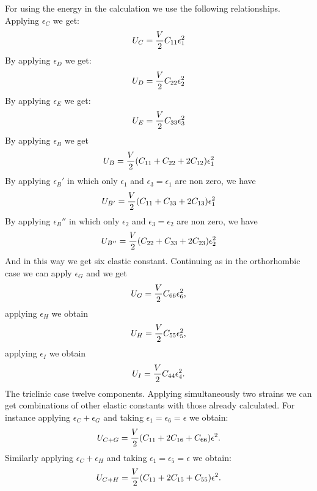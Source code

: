 \documentclass[12pt,a4paper]{article}
\begin{document}
For using the energy in the calculation we use the following
relationships. Applying $\epsilon_C$ we get:
\begin{equation}
U_C= {V \over 2} C_{11} \epsilon_1^2
\end{equation}
By applying $\epsilon_D$ we get:
\begin{equation}
U_D= {V \over 2} C_{22} \epsilon_2^2
\end{equation}
By applying $\epsilon_E$ we get:
\begin{equation}
U_E= {V \over 2} C_{33} \epsilon_3^2
\end{equation}
By applying $\epsilon_B$ we get
\begin{equation}
U_B= {V \over 2} (C_{11} + C_{22} + 2 C_{12}) \epsilon_1^2
\end{equation}
By applying $\epsilon_B'$ in which only $\epsilon_1$ and
$\epsilon_3=\epsilon_1$ are non zero, we have
\begin{equation}
U_{B'}= {V \over 2} (C_{11} + C_{33} + 2 C_{13}) \epsilon_1^2
\end{equation}
By applying $\epsilon_B''$ in which only $\epsilon_2$ and
$\epsilon_3=\epsilon_2$ are non zero, we have
\begin{equation}
U_{B''}= {V \over 2} (C_{22} + C_{33} + 2 C_{23}) \epsilon_2^2
\end{equation}
And in this way we get six elastic constant. Continuing as in the
orthorhombic case we can
apply $\epsilon_G$ and we get
\begin{equation}
U_G= {V \over 2} C_{66} \epsilon_6^2,
\end{equation}
applying $\epsilon_H$ we obtain
\begin{equation}
U_H= {V \over 2} C_{55} \epsilon_5^2,
\end{equation}
applying $\epsilon_I$ we obtain
\begin{equation}
U_I= {V \over 2} C_{44} \epsilon_4^2.
\end{equation}
The triclinic case twelve components. Applying simultaneously two strains
we can get combinations of other elastic constants with those already
calculated. For instance applying $\epsilon_C + \epsilon_G$ and taking
$\epsilon_1=\epsilon_6=\epsilon$ we obtain:
\begin{equation}
U_{C+G}= {V \over 2} (C_{11}+2 C_{16} + C_{66}) \epsilon^2.
\end{equation}
Similarly applying $\epsilon_C + \epsilon_H$ and taking $\epsilon_1=
\epsilon_5=\epsilon$ we obtain:
\begin{equation}
U_{C+H}= {V \over 2} (C_{11}+2 C_{15} + C_{55}) \epsilon^2.
\end{equation}
\end{document}
